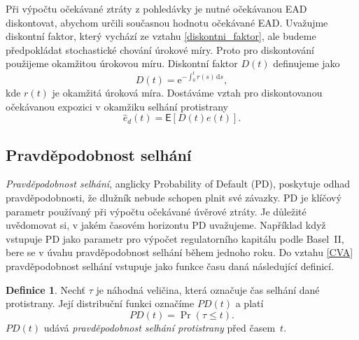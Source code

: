 \documentclass[a4paper,12pt]{report}
\theoremstyle{definition} \newtheorem{definice}[veta]{Definice}
\theoremstyle{remark}
\begin{document}
Při výpočtu očekávané ztráty z pohledávky je nutné očekávanou EAD diskontovat, abychom určili současnou hodnotu očekávané EAD. 
Uvažujme diskontní faktor, který vychází ze vztahu \eqref{diskontni_faktor}, ale budeme předpokládat stochastické chování úrokové míry.
Proto pro diskontování použijeme okamžitou úrokovou míru.
Diskontní faktor $D(t)$ definujeme jako
\begin{equation}\label{diskont_vztah}
D(t)=\mathrm{e}^{-\int_0^t r(s)\,\mathrm{d} s},
\end{equation}
kde $r(t)$ je okamžitá úroková míra. 
Dostáváme vztah pro diskontovanou očekávanou expozici v okamžiku selhání protistrany
\begin{equation}\label{dis_exposure_vztah}
\hat{e}_d(t)=\mathsf{E}[D(t) e(t)].
\end{equation}

\subsection{Pravděpodobnost selhání}
\textit{Pravděpodobnost selhání}, anglicky Probability of Default (PD), poskytuje odhad pravděpodobnosti, že dlužník nebude schopen plnit své závazky.
PD je klíčový parametr používaný při výpočtu očekávané úvěrové ztráty.
Je důležité uvědomovat si, v jakém časovém horizontu PD uvažujeme.
Například když vstupuje PD jako parametr pro výpočet regulatorního kapitálu podle Basel~II, bere se v úvahu pravděpodobnost selhání během jednoho roku.
Do vztahu \eqref{CVA} pravděpodobnost selhání vstupuje jako funkce času daná následující definicí. %
\begin{definice}\label{pd_def}
Nechť $\tau$ je náhodná veličina, která označuje čas selhání dané protistrany.
Její distribuční funkci označíme $PD(t)$ a platí
\begin{equation}
PD(t)=\Pr(\tau\leq t).
\end{equation}
$PD(t)$ udává \textit{pravděpodobnost selhání protistrany} před časem~$t$.
\end{definice}
\end{document}
